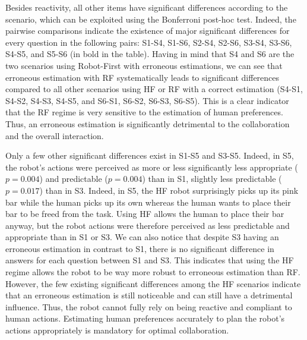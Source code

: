 Besides reactivity, all other items have significant differences according to the scenario, which can be exploited using the Bonferroni post-hoc test. 
Indeed, the pairwise comparisons indicate the existence of major significant differences for every question in the following pairs: S1-S4, S1-S6, S2-S4, S2-S6, S3-S4, S3-S6, S4-S5, and S5-S6 (in bold in the table). Having in mind that S4 and S6 are the two scenarios using Robot-First with erroneous estimations, we can see that erroneous estimation with RF systematically leads to significant differences compared to all other scenarios using HF or RF with a correct estimation (S4-S1, S4-S2, S4-S3, S4-S5, and S6-S1, S6-S2, S6-S3, S6-S5). This is a clear indicator that the RF regime is very sensitive to the estimation of human preferences. Thus, an erroneous estimation is significantly detrimental to the collaboration and the overall interaction. 

Only a few other significant differences exist in S1-S5 and S3-S5. Indeed, in S5, the robot's actions were perceived as more or less significantly less appropriate ($p=0.004$) and predictable ($p=0.004$) than in S1, slightly less predictable ($p=0.017$) than in S3. Indeed, in S5, the HF robot surprisingly picks up its pink bar while the human picks up its own whereas the human wants to place their bar to be freed from the task. Using HF allows the human to place their bar anyway, but the robot actions were therefore perceived as less predictable and appropriate than in S1 or S3. 
We can also notice that despite S3 having an erroneous estimation in contrast to S1, there is no significant difference in answers for each question between S1 and S3. 
This indicates that using the HF regime allows the robot to be way more robust to erroneous estimation than RF. However, the few existing significant differences among the HF scenarios indicate that an erroneous estimation is still noticeable and can still have a detrimental influence. Thus, the robot cannot fully rely on being reactive and compliant to human actions. Estimating human preferences accurately to plan the robot's actions appropriately is mandatory for optimal collaboration.

